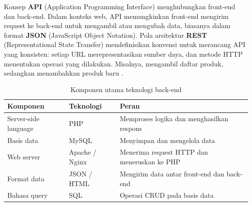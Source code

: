 
Konsep \textbf{API} (Application Programming Interface) menghubungkan front-end dan back-end. Dalam konteks web, API memungkinkan front-end mengirim request ke back-end untuk mengambil atau mengubah data, biasanya dalam format \textbf{JSON} (JavaScript Object Notation). Pola arsitektur \textbf{REST} (Representational State Transfer) mendefinisikan konvensi untuk merancang API yang konsisten: setiap URL merepresentasikan sumber daya, dan metode HTTP menentukan operasi yang dilakukan. Misalnya,  mengambil daftar produk, sedangkan  menambahkan produk baru \cite{mdnLearn}.

\begin{table}[htbp]
\centering
\begin{tabular}{|P{3cm}|P{4cm}|P{4.5cm}|}
\hline
\textbf{Komponen} & \textbf{Teknologi} & \textbf{Peran} \\
\hline
Server-side language & PHP & Memproses logika dan menghasilkan respons \\
\hline
Basis data & MySQL & Menyimpan dan mengelola data \\
\hline
Web server & Apache / Nginx & Menerima request HTTP dan meneruskan ke PHP \\
\hline
Format data & JSON / HTML & Mengirim data antar front-end dan back-end \\
\hline
Bahasa query & SQL & Operasi CRUD pada basis data \\
\hline
\end{tabular}
\caption{Komponen utama teknologi back-end}
\end{table}

